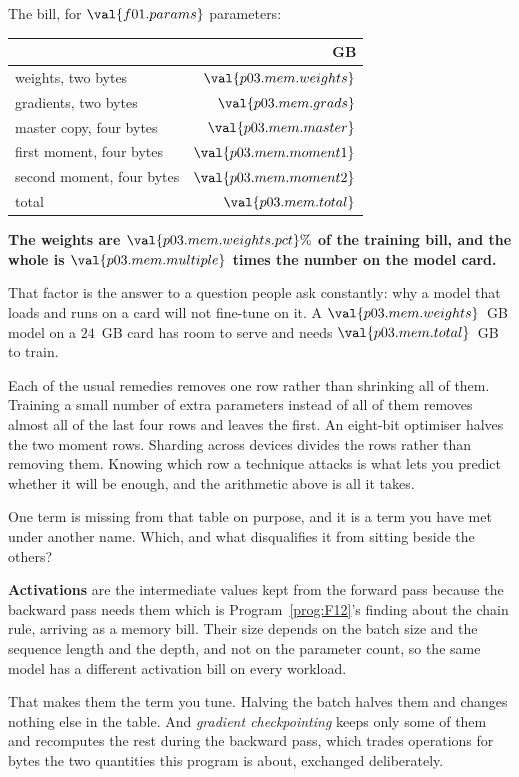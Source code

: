 \begin{fr}
The bill, for $\val{f01.params}$ parameters:

\begin{center}
\begin{tabular}{lr}
\toprule
 & GB \\
\midrule
weights, two bytes & $\val{p03.mem.weights}$ \\
gradients, two bytes & $\val{p03.mem.grads}$ \\
master copy, four bytes & $\val{p03.mem.master}$ \\
first moment, four bytes & $\val{p03.mem.moment1}$ \\
second moment, four bytes & $\val{p03.mem.moment2}$ \\
\midrule
total & $\val{p03.mem.total}$ \\
\bottomrule
\end{tabular}
\end{center}

\textbf{The weights are $\val{p03.mem.weights.pct}\%$ of the training bill, and
the whole is $\val{p03.mem.multiple}$ times the number on the model card.}

\begin{aibox}
That factor is the answer to a question people ask constantly: why a model that
loads and runs on a card will not fine-tune on it. A $\val{p03.mem.weights}$~GB
model on a $24$~GB card has room to serve and needs
$\val{p03.mem.total}$~GB to train.

Each of the usual remedies removes one row rather than shrinking all of them.
Training a small number of extra parameters instead of all of them removes
almost all of the last four rows and leaves the first. An eight-bit optimiser
halves the two moment rows. Sharding across devices divides the rows rather
than removing them. Knowing which row a technique attacks is what lets you
predict whether it will be enough, and the arithmetic above is all it takes.
\end{aibox}

One term is missing from that table on purpose, and it is a term you have met
under another name. Which, and what disqualifies it from sitting beside the
others?
\dotline
\nextframe
\end{fr}

\begin{fr}

\textbf{Activations} are the intermediate values kept from the forward pass
because the backward pass needs them \dash{} which is Program~\ref{prog:F12}'s
finding about the chain rule, arriving as a memory bill. Their size depends on
the batch size and the sequence length and the depth, and not on the parameter
count, so the same model has a different activation bill on every workload.

That makes them the term you tune. Halving the batch halves them and changes
nothing else in the table. And \emph{gradient checkpointing} keeps only some of
them and recomputes the rest during the backward pass, which trades operations
for bytes \dash{} the two quantities this program is about, exchanged
deliberately.
\end{fr}

